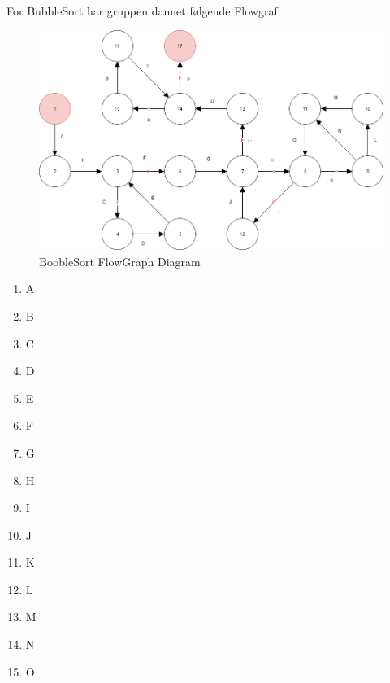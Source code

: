 \documentclass[11pt]{article}
\begin{document}
    \\
    \noindent
    For BubbleSort har gruppen dannet følgende Flowgraf:\\
    \begin{table}[H]
        \begin{minipage}{.7\textwidth}
            \begin{figure}[H]
            \centering
            \includegraphics[width=1\textwidth,angle=0]{Struktureret_System_Udvikling/Workshop_3/Booble_Sort_Flowgraph.png}
            \caption{BoobleSort FlowGraph Diagram}
            \label{fig:BoobleSortGraph}
            \end{figure}
        \end{minipage}
        \begin{minipage}{.3\textwidth}
            \begin{enumerate}[label=(\Alph*)]
                \item A
                \item B
                \item C
                \item D
                \item E
                \item F
                \item G
                \item H
                \item I
                \item J
                \item K
                \item L
                \item M
                \item N
                \item O
            \end{enumerate}
        \end{minipage}
    \end{table}
\end{document}
